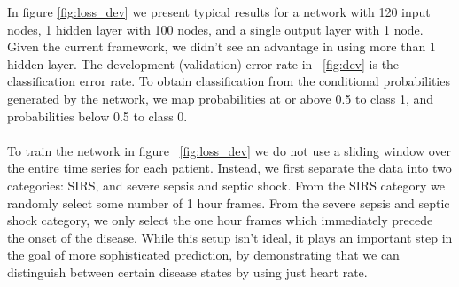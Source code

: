 \documentclass[12pt,solutions]{article}
\begin{document}
In figure \ref{fig:loss_dev} we present typical results for a network with 120 input nodes, 1 hidden layer with 100 nodes, and a single output layer with 1 node. Given the current framework, we didn't see an advantage in using more than 1 hidden layer. The development (validation) error rate
in ~\ref{fig:dev} is the classification error rate. To obtain classification from the conditional probabilities generated by the network, we
map probabilities at or above 0.5 to class 1, and probabilities below 0.5 to class 0.
\\
\\
To train the network in figure ~\ref{fig:loss_dev} we do not use a sliding window over the entire time series for each patient. Instead, we 
first separate the data into two categories: SIRS, and severe sepsis and septic shock. From the SIRS category we randomly select some
number of 1 hour frames. From the severe sepsis and septic shock category, we only select the one hour frames which immediately precede 
the onset of the disease. While this setup isn't ideal, it plays an important step in the goal of more sophisticated prediction, by
demonstrating that we can distinguish between certain disease states by using just heart rate.
\end{document}

